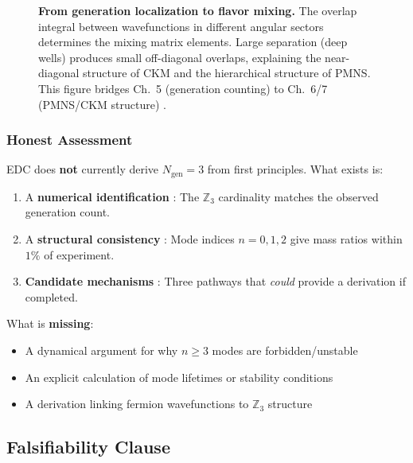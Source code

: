 \begin{figure}[htbp]
\centering

\caption{\textbf{From generation localization to flavor mixing.}
The overlap integral between wavefunctions in different angular sectors
determines the mixing matrix elements. Large separation (deep wells) produces
small off-diagonal overlaps, explaining the near-diagonal structure of CKM
and the hierarchical structure of PMNS. This figure bridges Ch.~5 (generation
counting) to Ch.~6/7 (PMNS/CKM structure) \tagI{}.}
\label{fig:ch5_overlap_mixing}
\end{figure}

\subsubsection{Honest Assessment}

\begin{tcolorbox}[colback=gray!5, colframe=gray!50!black,
    title=\textbf{Current Status: [I]/[P] — Not Derived}]
EDC does \textbf{not} currently derive $N_{\text{gen}} = 3$ from first principles.
What exists is:
\begin{enumerate}[nosep]
    \item A \textbf{numerical identification} \tagI{}: The $\mathbb{Z}_3$ cardinality
          matches the observed generation count.
    \item A \textbf{structural consistency} \tagI{}: Mode indices $n = 0, 1, 2$ give
          mass ratios within $1\%$ of experiment.
    \item \textbf{Candidate mechanisms} \tagP{}: Three pathways that \emph{could}
          provide a derivation if completed.
\end{enumerate}

What is \textbf{missing}:
\begin{itemize}[nosep]
    \item A dynamical argument for why $n \geq 3$ modes are forbidden/unstable
    \item An explicit calculation of mode lifetimes or stability conditions
    \item A derivation linking fermion wavefunctions to $\mathbb{Z}_3$ structure
\end{itemize}
\end{tcolorbox}

\subsection{Falsifiability Clause}
\label{sec:ch5_falsifiability}

